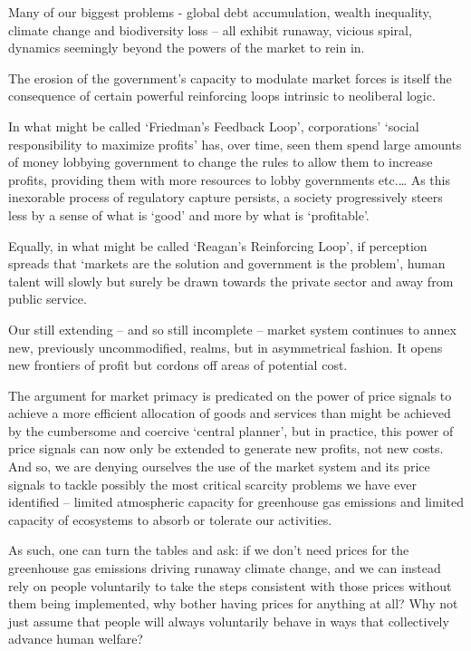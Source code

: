 \documentclass[
]{book}
\begin{document}
Many of our biggest problems - global debt accumulation, wealth inequality,
climate change and biodiversity loss -- all exhibit runaway, vicious spiral, dynamics seemingly
beyond the powers of the market to rein in.

The erosion of the government's capacity to modulate market forces is itself the consequence of
certain powerful reinforcing loops intrinsic to neoliberal logic.

In what might be called `Friedman's Feedback Loop', corporations' `social responsibility to maximize
profits' has, over time, seen them spend large amounts of money lobbying government to change the
rules to allow them to increase profits, providing them with more resources to lobby governments
etc.\ldots{} As this inexorable process of regulatory capture persists, a society progressively steers less by a
sense of what is `good' and more by what is `profitable'.

Equally, in what might be called `Reagan's Reinforcing Loop', if perception spreads that `markets are
the solution and government is the problem', human talent will slowly but surely be drawn towards
the private sector and away from public service.

Our still extending -- and so still incomplete -- market system continues to annex new, previously
uncommodified, realms, but in asymmetrical fashion. It opens new frontiers of profit but cordons off
areas of potential cost.

The argument for market primacy is predicated on the power of price signals to achieve a more
efficient allocation of goods and services than might be achieved by the cumbersome and coercive
`central planner', but in practice, this power of price signals can now only be extended to generate
new profits, not new costs. And so, we are denying ourselves the use of the market system and its
price signals to tackle possibly the most critical scarcity problems we have ever identified -- limited
atmospheric capacity for greenhouse gas emissions and limited capacity of ecosystems to absorb or
tolerate our activities.

As such, one can
turn the tables and ask: if we don't need prices for the greenhouse gas emissions driving runaway
climate change, and we can instead rely on people voluntarily to take the steps consistent with those
prices without them being implemented, why bother having prices for anything at all? Why not just
assume that people will always voluntarily behave in ways that collectively advance human welfare?
\end{document}
